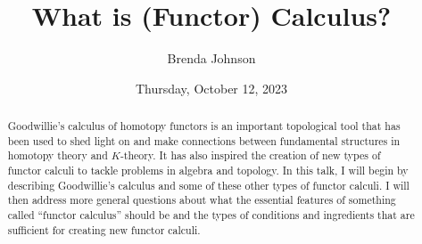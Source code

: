 \documentclass{UAmathtalk}
\author{Brenda Johnson}
\title{What is (Functor) Calculus?}
\date{Thursday, October 12, 2023}
\begin{document}
\maketitle

\begin{abstract}
Goodwillie’s calculus of homotopy functors is an important topological tool that has been used to shed light on and make connections between fundamental structures in homotopy theory and $K$-theory.  It has also inspired the creation of new types of functor calculi to tackle problems in algebra and topology.  In this talk, I will begin by describing Goodwillie’s calculus and some of these other types of functor calculi.  I will then address more general questions about what the essential features of something called “functor calculus” should be and the types of conditions and ingredients that are sufficient for creating new functor calculi.
\end{abstract}
\end{document}
